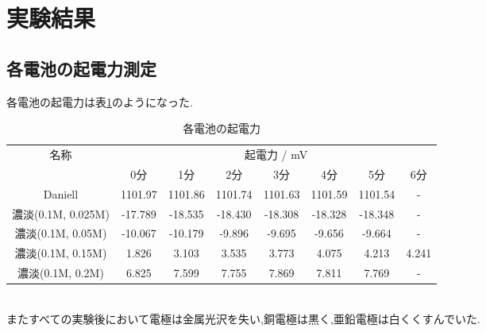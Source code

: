 \section{実験結果}
\subsection{各電池の起電力測定}
各電池の起電力は表\ref{tab:kidenryoku}のようになった.
\begin{table}[h]
   \caption{各電池の起電力}
   \label{tab:kidenryoku}
   \centering
   \begin{tabular}{c|ccccccc}
     \hline
     \multirow{2}{*}{名称} & \multicolumn{7}{c}{起電力 / \si{\milli\volt}}\\
     &0分&1分&2分&3分&4分&5分&6分\\
     \hline \hline
     Daniell&1101.97&1101.86&1101.74&1101.63&1101.59&1101.54&-\\
     濃淡(0.1M, 0.025M)&-17.789&-18.535&-18.430&-18.308&-18.328&-18.348&-\\
     濃淡(0.1M, 0.05M)&-10.067&-10.179&-9.896&-9.695&-9.656&-9.664&-\\
     濃淡(0.1M, 0.15M)&1.826&3.103&3.535&3.773&4.075&4.213&4.241\\
     濃淡(0.1M, 0.2M)&6.825&7.599&7.755&7.869&7.811&7.769&-\\
     \hline
   \end{tabular}
\end{table}\\
またすべての実験後において電極は金属光沢を失い,銅電極は黒く,亜鉛電極は白くくすんでいた.
